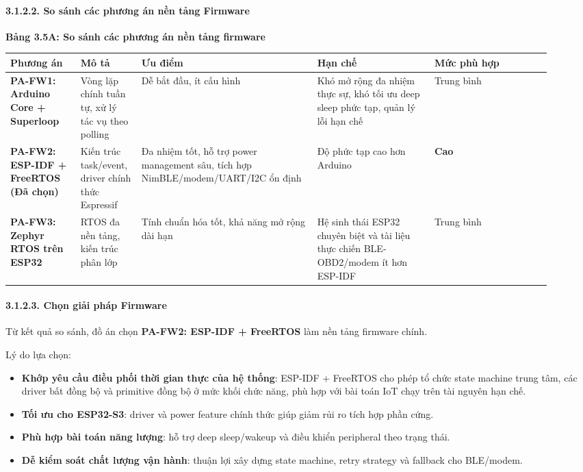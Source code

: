 \documentclass[13pt,a4paper]{extarticle}
\newcounter{none} %
\newcommand{\thesislongtableorignewline}{}
\let\thesislongtableorignewline\\
\renewcommand{\\}{\thesislongtableorignewline\hline}%
\let\\\thesislongtableorignewline
\newcommand{\thesistabletitle}[1]{%
  \begin{center}\textbf{#1}\end{center}%
}
\providecommand{\tightlist}{%
  \setlength{\itemsep}{0pt}\setlength{\parskip}{0pt}}
\begin{document}
\paragraph{3.1.2.2. So sánh các phương án nền tảng
Firmware}\label{3122-so-suxe1nh-cuxe1c-phux1b0ux1a1ng-uxe1n-nux1ec1n-tux1ea3ng-firmware}

\thesistabletitle{Bảng 3.5A: So sánh các phương án nền tảng firmware}

{\def\LTcaptype{none} %
\begin{longtable}{|p{0.12\linewidth}|p{0.10\linewidth}|p{0.30\linewidth}|p{0.20\linewidth}|p{0.20\linewidth}|}
\hline \textbf{Phương án} & \textbf{Mô tả} & \textbf{Ưu điểm} & \textbf{Hạn chế} & \textbf{Mức phù hợp} \\
\hline
\endhead
\hline
\endlastfoot
\textbf{PA-FW1: Arduino Core + Superloop} & Vòng lặp chính tuần tự, xử
lý tác vụ theo polling & Dễ bắt đầu, ít cấu hình & Khó mở rộng đa nhiệm
thực sự, khó tối ưu deep sleep phức tạp, quản lý lỗi hạn chế & Trung
bình \\
\textbf{PA-FW2: ESP-IDF + FreeRTOS (Đã chọn)} & Kiến trúc task/event,
driver chính thức Espressif & Đa nhiệm tốt, hỗ trợ power management sâu,
tích hợp NimBLE/modem/UART/I2C ổn định & Độ phức tạp cao hơn Arduino &
\textbf{Cao} \\
\textbf{PA-FW3: Zephyr RTOS trên ESP32} & RTOS đa nền tảng, kiến trúc
phân lớp & Tính chuẩn hóa tốt, khả năng mở rộng dài hạn & Hệ sinh thái
ESP32 chuyên biệt và tài liệu thực chiến BLE-OBD2/modem ít hơn ESP-IDF &
Trung bình \\
\end{longtable}
}

\paragraph{3.1.2.3. Chọn giải pháp
Firmware}\label{3123-chux1ecdn-giux1ea3i-phuxe1p-firmware}

Từ kết quả so sánh, đồ án chọn \textbf{PA-FW2: ESP-IDF + FreeRTOS} làm
nền tảng firmware chính.

Lý do lựa chọn:

\begin{itemize}
\tightlist
\item
  \textbf{Khớp yêu cầu điều phối thời gian thực của hệ thống}: ESP-IDF +
  FreeRTOS cho phép tổ chức state machine trung tâm, các driver bất đồng
  bộ và primitive đồng bộ ở mức khối chức năng, phù hợp với bài toán IoT
  chạy trên tài nguyên hạn chế.
\item
  \textbf{Tối ưu cho ESP32-S3}: driver và power feature chính thức giúp
  giảm rủi ro tích hợp phần cứng.
\item
  \textbf{Phù hợp bài toán năng lượng}: hỗ trợ deep sleep/wakeup và điều
  khiển peripheral theo trạng thái.
\item
  \textbf{Dễ kiểm soát chất lượng vận hành}: thuận lợi xây dựng state
  machine, retry strategy và fallback cho BLE/modem.
\end{itemize}
\end{document}
